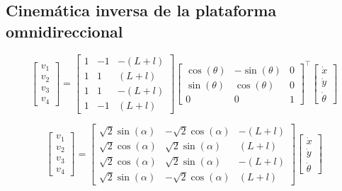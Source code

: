 \subsection{Cinemática inversa de la plataforma omnidireccional}

\begin{equation*}
    \begin{bmatrix}
        v_1 \\
        v_2 \\
        v_3 \\
        v_4
    \end{bmatrix} =
    \begin{bmatrix}
        1 & -1 & -(L+l) \\
        1 & 1 & (L+l) \\
        1 & 1 & -(L+l) \\
        1 & -1 & (L+l)
    \end{bmatrix}
    \begin{bmatrix}
        \cos(\theta) & -\sin(\theta) & 0 \\
        \sin(\theta) & \cos(\theta) & 0 \\
        0 & 0 & 1
    \end{bmatrix}^\top
    \begin{bmatrix}
        \dot{x} \\
        \dot{y} \\
        \dot{\theta}
    \end{bmatrix}
\end{equation*}

\begin{equation*}
    \begin{bmatrix}
        v_1 \\
        v_2 \\
        v_3 \\
        v_4
    \end{bmatrix} =
    \begin{bmatrix}
        \sqrt{2}\sin(\alpha) & -\sqrt{2}\cos(\alpha) & -(L+l) \\
        \sqrt{2}\cos(\alpha) & \sqrt{2}\sin(\alpha) & (L+l) \\
        \sqrt{2}\cos(\alpha) & \sqrt{2}\sin(\alpha) & -(L+l) \\
        \sqrt{2}\sin(\alpha) & -\sqrt{2}\cos(\alpha) & (L+l)
    \end{bmatrix}
    \begin{bmatrix}
        \dot{x} \\
        \dot{y} \\
        \dot{\theta}
    \end{bmatrix}
\end{equation*}

